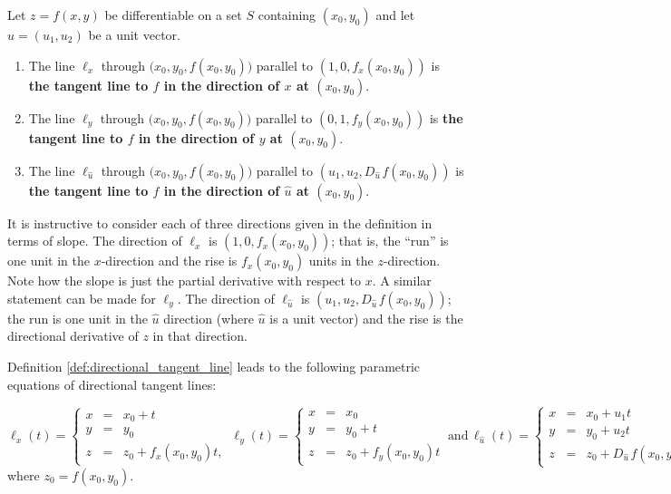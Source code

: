 \begin{definition}\label{def:directional_tangent_line}
Let $z=f(x,y)$ be differentiable on a set $S$ containing $(x_0,y_0)$ and let $\hat u = \left( u_1, u_2\right)$ be a unit vector.
 
\vspace{-0.5cm}
\begin{enumerate}
	\item The line $\ell_x$ through $\big(x_0,y_0,f(x_0,y_0)\big)$ parallel to $\left( 1,0,f_x(x_0,y_0)\right)$	is \textbf{the tangent line to $f$ in the direction of $x$ at $(x_0,y_0)$}.
	
	\item The line $\ell_y$  through $\big(x_0,y_0,f(x_0,y_0)\big)$ parallel to $\left( 0,1,f_y(x_0,y_0)\right)$ is \textbf{the tangent line to $f$ in the direction of $y$ at $(x_0,y_0)$}.
	
	\item	 The line $\ell_{\hat u}$ through $\big(x_0,y_0,f(x_0,y_0)\big)$ parallel to $\left( u_1,u_2,D_{\hat u\,}f(x_0,y_0)\right)$ is \textbf{the tangent line to $f$ in the direction of $\hat u$ at $(x_0,y_0)$}.
	\end{enumerate}
\end{definition}


It is instructive to consider each of three directions given in the definition in terms of slope. The direction of $\ell_x$ is $\left( 1,0,f_x(x_0,y_0)\right)$; that is, the ``run'' is one unit in the $x$-direction and the rise is $f_x(x_0,y_0)$ units in the $z$-direction. Note how the slope is just the partial derivative with respect to $x$. A similar statement can be made for $\ell_y$. The direction of $\ell_{\hat u}$ is $\left( u_1,u_2,D_{\hat u\,}f(x_0,y_0)\right)$; the run is one unit in the $\hat u$ direction (where $\hat u$ is a unit vector) and the rise is the directional derivative of $z$ in that direction.


Definition \ref{def:directional_tangent_line} leads to the following parametric equations of directional tangent lines:


$$\ell_x(t) = \left\{\begin{array}{rcl} x&=&x_0+t \\ y&=&y_0\\z&=&z_0+f_x(x_0,y_0)t, \end{array}\right. \, \ell_y(t)=\left\{\begin{array}{rcl} x&=&x_0 \\ y&=&y_0+t\\z&=&z_0+f_y(x_0,y_0)t \end{array}\right.\  \text{and}\, \ell_{\hat u}(t)=\left\{\begin{array}{rcl} x&=&x_0+u_1t \\ y&=&y_0+u_2t\\z&=&z_0+D_{\hat u\,}f(x_0,y_0)t. \end{array}\right.$$
where $z_0=f(x_0,y_0)$.


